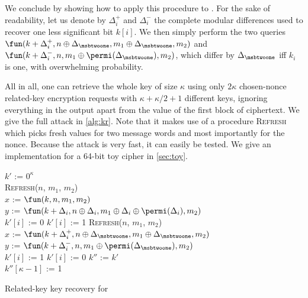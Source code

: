 We conclude by showing how to apply this procedure to \proestotr. For the sake of readability, let us denote
by $\Delta_i^+$ and $\Delta_i^-$ the complete modular differences used to recover one less significant bit $k[i]$.
We then simply perform the two queries $\fun(k + \Delta_i^+, n \oplus \Delta_{\msbtwoone}, m_1 \oplus \Delta_{\msbtwoone}, m_2)$
and $\fun(k + \Delta_i^-, n, m_1 \oplus \permi(\Delta_{\msbtwoone}), m_2)$, which differ by $\Delta_{\msbtwoone}$ iff $k_i$ is one,
with overwhelming probability.

All in all, one can retrieve the whole key of size
$\kappa$ using only $2\kappa$ chosen-nonce related-key encryption requests with $\kappa + \kappa/2 + 1$ different keys, ignoring
everything in the output apart from the value of the first block
of ciphertext. We give the full attack in \autoref{alg:kr}. Note that it makes use
of a procedure \textsc{Refresh} which picks fresh values for two message words and most importantly
for the nonce. Because
the attack is very fast, it can easily be tested. We give an implementation
for a 64-bit toy cipher in \autoref{sec:toy}.

\begin{algorithm}[h]
\LinesNumbered
{}

$k'$ := $0^\kappa$\\
{
	\textsc{Refresh}($n$, $m_1$, $m_2$)\\
	$x$ := $\fun(k, n, m_1, m_2)$\\
	$y$ := $\fun(k + \Delta_i, n \oplus \Delta_i,
                 m_1 \oplus \Delta_i \oplus \permi(\Delta_i), m_2)$\\
	{
		$k'[i]$ := 0	
	}
	\Else
	{
		$k'[i]$ := 1
	}
}
{
	\textsc{Refresh}($n$, $m_1$, $m_2$)\\
	$x$ := $\fun(k + \Delta_i^+, n \oplus \Delta_{\msbtwoone}, m_1 \oplus \Delta_{\msbtwoone}, m_2)$\\
	$y$ := $\fun(k + \Delta_i^-, n, m_1 \oplus \permi(\Delta_{\msbtwoone}), m_2)$\\
	{
		$k'[i]$ := 1	
	}
	\Else
	{
		$k'[i]$ := 0
	}
}
$k''$ := $k'$\\
$k''[\kappa - 1]$ := 1\\
\caption{Related-key key recovery for \proestotr\label{alg:kr}}
\end{algorithm}


